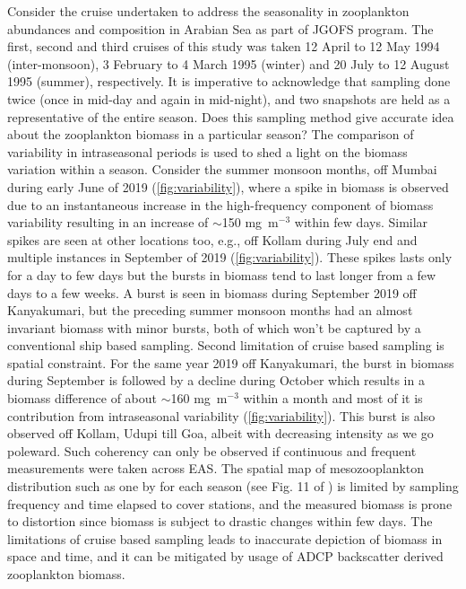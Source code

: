 \documentclass[authoryear,review,12pt]{elsarticle}
\begin{document}
    Consider the cruise undertaken to address the seasonality in zooplankton abundances and composition \citep{madhupratap1996lack} in Arabian Sea as part of JGOFS program. The first, second and third cruises of this study was taken  12 April to 12 May 1994 (inter-monsoon), 3 February to 4 March 1995 (winter) and 20 July to 12 August 1995 (summer), respectively. It is imperative to acknowledge that sampling done twice (once in mid-day and again in mid-night), and two snapshots are held as a representative of the entire season. Does this sampling method give accurate idea about the zooplankton biomass in a particular season? The comparison of variability in intraseasonal periods is used to shed a light on the biomass variation within a season. Consider the summer monsoon months, off Mumbai during early June of 2019 (\cref{fig:variability}), where a spike in biomass is observed due to an instantaneous increase in the high-frequency component of biomass variability resulting in an increase of $\sim$150 mg~m$^{-3}$ within few days. Similar spikes are seen at other locations too, e.g., off Kollam during July end and multiple instances in September of 2019 (\cref{fig:variability}). These spikes lasts only for a day to few days but the bursts in biomass tend to last longer from a few days to a few weeks. A burst is seen in biomass during September 2019 off Kanyakumari, but the preceding summer monsoon months had an almost invariant biomass with minor bursts, both of which won’t be captured by a conventional ship based sampling. Second limitation of cruise based sampling is spatial constraint. For the same year 2019 off Kanyakumari, the burst in biomass during September is followed by a decline during October which results in a biomass difference of about $\sim$160 mg~m$^{-3}$ within a month and most of it is contribution from intraseasonal variability (\cref{fig:variability}). This burst is also observed off Kollam, Udupi till Goa, albeit with decreasing intensity as we go poleward. Such coherency can only be observed if continuous and frequent measurements were taken across EAS. The spatial map of mesozooplankton distribution such as one by \citet{jyothibabu2010re} for each season (see Fig. 11 of \cite{jyothibabu2010re}) is limited by sampling frequency and time elapsed to cover stations, and the measured biomass is prone to distortion since biomass is subject to drastic changes within few days. The limitations of cruise based sampling leads to inaccurate depiction of biomass in space and time, and it can be mitigated by usage of ADCP backscatter derived zooplankton biomass.
     
\end{document}
